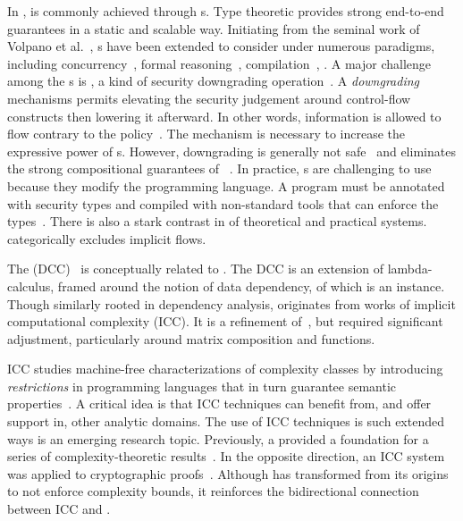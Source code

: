 In ,  is commonly achieved through s.
Type theoretic  provides strong end-to-end  guarantees in a static and scalable way.
Initiating from the seminal work of Volpano et al.~\cite{volpanoI1996}, s have been extended to consider  under numerous paradigms,
including concurrency~\cite{volpano1998,derakhshan2024,frumin2021}, formal reasoning~\cite{nelson2020,frumin2021}, compilation~\cite{barthe2004}, \etc.
A major challenge among the s is \emph{}, a kind of security downgrading operation~\cite{cecchetti2017}. A \emph{downgrading} mechanisms permits elevating the security judgement around control-flow constructs then lowering it afterward.
In other words, information is allowed to flow contrary to the policy~\cite{cecchetti2017}.
The mechanism is necessary to increase the expressive power of s.
However, downgrading is generally not safe~\cite{derakhshan2024} and eliminates the strong compositional guarantees of ~\cite{cecchetti2017}.
In practice, s are challenging to use because they modify the programming language.
A program must be annotated with security types and compiled with non-standard tools that can enforce the types~\cite{lamba2024}.
There is also a stark contrast in  of theoretical and practical systems.
\Eg \cite{huang2014} categorically excludes implicit flows.

The  (DCC)~\cite{abadi1999b} is conceptually related to \lname.
The DCC is an extension of lambda-calculus, framed around the notion of data dependency, of which  is an instance.
Though similarly rooted in dependency analysis, \lname originates from works of implicit computational complexity (ICC).
It is a refinement of~\cite{moyen20172,aubert20232}, but \lname required significant adjustment, particularly around matrix composition and functions.

ICC studies machine-free characterizations of complexity classes by introducing \emph{restrictions} in programming languages that in turn guarantee semantic properties~\cite{dallago2011}.
A critical idea is that ICC techniques can benefit from, and offer support in, other analytic domains.
The use of ICC techniques is such extended ways is an emerging research topic.
Previously, a   provided a foundation for a series of complexity-theoretic results~\cite{marion2011,hainry2023}.
In the opposite direction, an ICC system was applied to cryptographic proofs~\cite{baillot2019}.
Although \lname has transformed from its origins to not enforce complexity bounds, it reinforces the bidirectional connection between ICC and .

